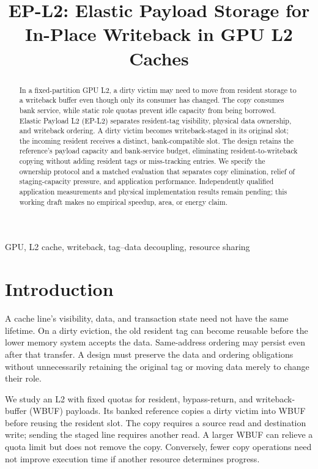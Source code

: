 \documentclass[conference,letterpaper]{IEEEtran}
\begin{document}
\title{EP-L2: Elastic Payload Storage for\\In-Place Writeback in GPU L2 Caches}
\author{}
\maketitle
\begin{abstract}
In a fixed-partition GPU L2, a dirty victim may need to move from resident storage to a writeback buffer even though only its consumer has changed. The copy consumes bank service, while static role quotas prevent idle capacity from being borrowed. Elastic Payload L2 (EP-L2) separates resident-tag visibility, physical data ownership, and writeback ordering. A dirty victim becomes writeback-staged in its original slot; the incoming resident receives a distinct, bank-compatible slot. The design retains the reference's payload capacity and bank-service budget, eliminating resident-to-writeback copying without adding resident tags or miss-tracking entries. We specify the ownership protocol and a matched evaluation that separates copy elimination, relief of staging-capacity pressure, and application performance. Independently qualified application measurements and physical implementation results remain pending; this working draft makes no empirical speedup, area, or energy claim.
\end{abstract}
\begin{IEEEkeywords}
GPU, L2 cache, writeback, tag--data decoupling, resource sharing
\end{IEEEkeywords}

\section{Introduction}
A cache line's visibility, data, and transaction state need not have the same lifetime. On a dirty eviction, the old resident tag can become reusable before the lower memory system accepts the data. Same-address ordering may persist even after that transfer. A design must preserve the data and ordering obligations without unnecessarily retaining the original tag or moving data merely to change their role.

We study an L2 with fixed quotas for resident, bypass-return, and writeback-buffer (WBUF) payloads. Its banked reference copies a dirty victim into WBUF before reusing the resident slot. The copy requires a source read and destination write; sending the staged line requires another read. A larger WBUF can relieve a quota limit but does not remove the copy. Conversely, fewer copy operations need not improve execution time if another resource determines progress.
\end{document}
